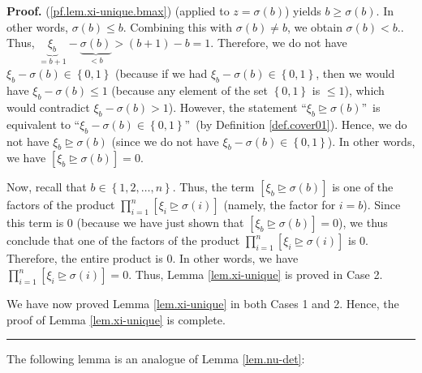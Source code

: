 \documentclass
[numbers=enddot,12pt,final,onecolumn,notitlepage,english]{scrartcl}%
\theoremstyle{definition}
\newenvironment{proof}[1][Proof]{\noindent\textbf{#1.} }{\ \rule{0.5em}{0.5em}}
\let\prodnonlimits\prod
\renewcommand{\prod}{\prodnonlimits\limits}
\newenvironment{verlong}{}{}
\begin{document}
\begin{verlong}
\begin{proof}
{(\ref{pf.lem.xi-unique.bmax}) (applied to $z=\sigma\left(  b\right)  $) yields
$b\geq\sigma\left(  b\right)  $. In other words, $\sigma\left(  b\right)  \leq
b$. Combining this with $\sigma\left(  b\right)  \neq b$, we obtain
$\sigma\left(  b\right)  <b$.}. Thus, $\underbrace{\xi_{b}}_{=b+1}%
-\underbrace{\sigma\left(  b\right)  }_{<b}>\left(  b+1\right)  -b=1$.
Therefore, we do not have $\xi_{b}-\sigma\left(  b\right)  \in\left\{
0,1\right\}  $ (because if we had $\xi_{b}-\sigma\left(  b\right)  \in\left\{
0,1\right\}  $, then we would have $\xi_{b}-\sigma\left(  b\right)  \leq1$
(because any element of the set $\left\{  0,1\right\}  $ is $\leq1$), which
would contradict $\xi_{b}-\sigma\left(  b\right)  >1$). However, the statement
\textquotedblleft$\xi_{b}\trianglerighteq\sigma\left(  b\right)
$\textquotedblright\ is equivalent to \textquotedblleft$\xi_{b}-\sigma\left(
b\right)  \in\left\{  0,1\right\}  $\textquotedblright\ (by Definition
\ref{def.cover01}). Hence, we do not have $\xi_{b}\trianglerighteq
\sigma\left(  b\right)  $ (since we do not have $\xi_{b}-\sigma\left(
b\right)  \in\left\{  0,1\right\}  $). In other words, we have $\left[
\xi_{b}\trianglerighteq\sigma\left(  b\right)  \right]  =0$.

Now, recall that $b\in\left\{  1,2,\ldots,n\right\}  $. Thus, the term
$\left[  \xi_{b}\trianglerighteq\sigma\left(  b\right)  \right]  $ is one of
the factors of the product $\prod_{i=1}^{n}\left[  \xi_{i}\trianglerighteq
\sigma\left(  i\right)  \right]  $ (namely, the factor for $i=b$). Since this
term is $0$ (because we have just shown that $\left[  \xi_{b}\trianglerighteq
\sigma\left(  b\right)  \right]  =0$), we thus conclude that one of the
factors of the product $\prod_{i=1}^{n}\left[  \xi_{i}\trianglerighteq
\sigma\left(  i\right)  \right]  $ is $0$. Therefore, the entire product is
$0$. In other words, we have $\prod_{i=1}^{n}\left[  \xi_{i}\trianglerighteq
\sigma\left(  i\right)  \right]  =0$. Thus, Lemma \ref{lem.xi-unique} is
proved in Case 2.

We have now proved Lemma \ref{lem.xi-unique} in both Cases 1 and 2. Hence, the
proof of Lemma \ref{lem.xi-unique} is complete.
\end{proof}
\end{verlong}

The following lemma is an analogue of Lemma \ref{lem.nu-det}:
\end{document}
